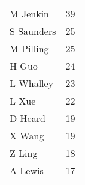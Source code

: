 \begin{table}[H] \centering\begin{tabular}{lr}
\toprule
   \hphantom{ } M Jenkin &  39 \\
 \hphantom{ } S Saunders &  25 \\
  \hphantom{ } M Pilling &  25 \\
      \hphantom{ } H Guo &  24 \\
  \hphantom{ } L Whalley &  23 \\
      \hphantom{ } L Xue &  22 \\
    \hphantom{ } D Heard &  19 \\
     \hphantom{ } X Wang &  19 \\
     \hphantom{ } Z Ling &  18 \\
    \hphantom{ } A Lewis &  17 \\
\bottomrule
\end{tabular}
    \label{tab:degree_Author}
    \end{table}

    